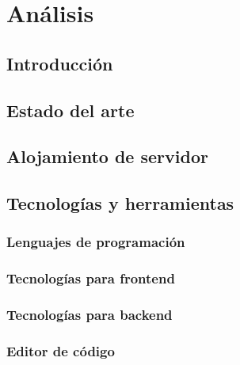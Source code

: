 \section{Análisis}

\subsection{Introducción}

\subsection{Estado del arte}

\subsection{Alojamiento de servidor}
 
\subsection{Tecnologías y herramientas}

	\subsubsection{Lenguajes de programación}
	\subsubsection{Tecnologías para frontend}
	\subsubsection{Tecnologías para backend}
	\subsubsection{Editor de código}

\newpage



